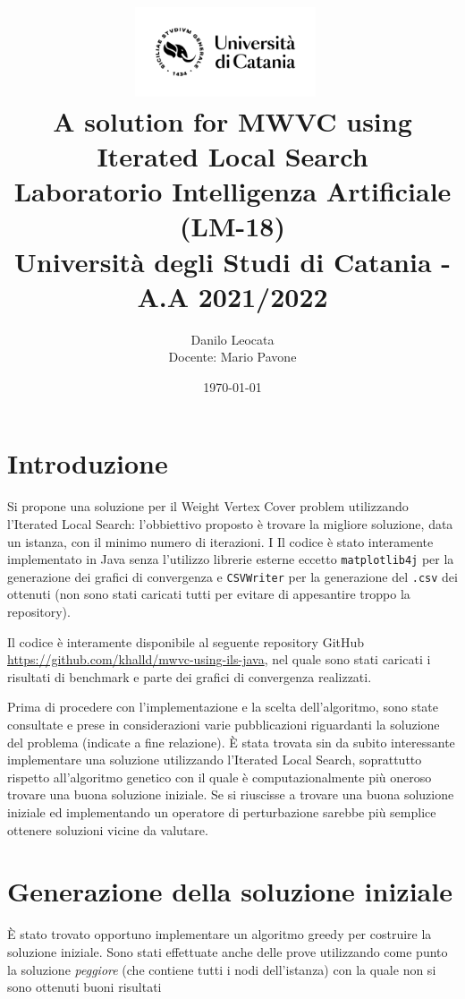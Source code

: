 \documentclass[11pt]{article}
\title{ %
\includegraphics[width=0.4\textwidth]{UniCT-Logo-Nero}~\\
A solution for MWVC using Iterated Local Search \\ 
\large Laboratorio Intelligenza Artificiale (LM-18) \\ Università degli Studi di Catania - A.A 2021/2022 \\
}
\author{ Danilo Leocata \\ Docente: Mario Pavone}
\date{\today}
\begin{document}
\maketitle	
\pagebreak



\section{Introduzione}

Si propone una soluzione per il Weight Vertex Cover problem utilizzando l'Iterated Local Search: l'obbiettivo proposto è trovare la migliore soluzione, data un istanza, con il minimo numero di iterazioni. I
Il codice è stato interamente implementato in Java senza l'utilizzo librerie esterne eccetto \verb|matplotlib4j| per la generazione dei grafici di convergenza e \verb|CSVWriter| per la generazione del \verb|.csv| dei ottenuti (non sono stati caricati tutti per evitare di appesantire troppo la repository).

Il codice è interamente disponibile al seguente repository GitHub \href{https://github.com/khalld/mwvc-using-ils-java}{https://github.com/khalld/mwvc-using-ils-java}, nel quale sono stati caricati i risultati di benchmark e parte dei grafici di convergenza realizzati.

Prima di procedere con l'implementazione e la scelta dell'algoritmo, sono state consultate e prese in considerazioni varie pubblicazioni riguardanti la soluzione del problema (indicate a fine relazione). È stata trovata sin da subito interessante implementare una soluzione utilizzando l'Iterated Local Search, soprattutto rispetto all'algoritmo genetico con il quale è computazionalmente più oneroso trovare una buona soluzione iniziale.
Se si riuscisse a trovare una buona soluzione iniziale ed implementando un operatore di perturbazione sarebbe più semplice ottenere soluzioni vicine da valutare.

\pagebreak

\section{Generazione della soluzione iniziale}

È stato trovato opportuno implementare un algoritmo greedy per costruire la soluzione iniziale. Sono stati effettuate anche delle prove utilizzando come punto la soluzione \textit{peggiore} (che contiene tutti i nodi dell'istanza) con la quale non si sono ottenuti buoni risultati
\end{document}
